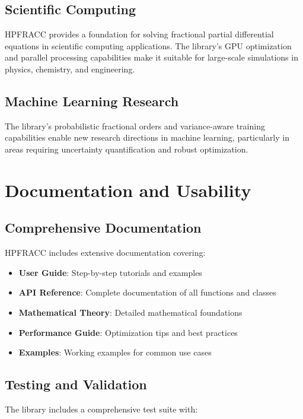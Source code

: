 \documentclass[12pt]{article}
\begin{document}
\subsection{Scientific Computing}

HPFRACC provides a foundation for solving fractional partial differential equations in scientific computing applications. The library's GPU optimization and parallel processing capabilities make it suitable for large-scale simulations in physics, chemistry, and engineering.

\subsection{Machine Learning Research}

The library's probabilistic fractional orders and variance-aware training capabilities enable new research directions in machine learning, particularly in areas requiring uncertainty quantification and robust optimization.

\section{Documentation and Usability}

\subsection{Comprehensive Documentation}

HPFRACC includes extensive documentation covering:

\begin{itemize}
\item \textbf{User Guide}: Step-by-step tutorials and examples
\item \textbf{API Reference}: Complete documentation of all functions and classes
\item \textbf{Mathematical Theory}: Detailed mathematical foundations
\item \textbf{Performance Guide}: Optimization tips and best practices
\item \textbf{Examples}: Working examples for common use cases
\end{itemize}

\subsection{Testing and Validation}

The library includes a comprehensive test suite with:
\end{document}
